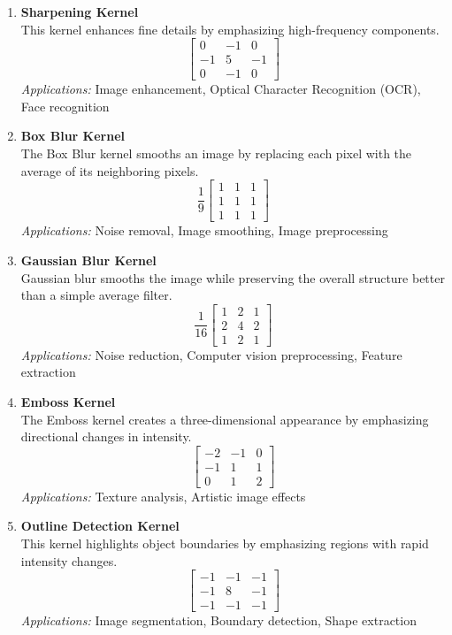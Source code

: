 \documentclass[11pt]{article}
\begin{document}
\begin{enumerate}
\item \textbf{Sharpening Kernel} \\
This kernel enhances fine details by emphasizing high-frequency components.
\[
\begin{bmatrix}
0 & -1 & 0 \\
-1 & 5 & -1 \\
0 & -1 & 0
\end{bmatrix}
\]
\textit{Applications:} Image enhancement, Optical Character Recognition (OCR), Face recognition

\item \textbf{Box Blur Kernel} \\
The Box Blur kernel smooths an image by replacing each pixel with the average of its neighboring pixels.
\[
\frac{1}{9}
\begin{bmatrix}
1 & 1 & 1 \\
1 & 1 & 1 \\
1 & 1 & 1
\end{bmatrix}
\]
\textit{Applications:} Noise removal, Image smoothing, Image preprocessing

\item \textbf{Gaussian Blur Kernel} \\
Gaussian blur smooths the image while preserving the overall structure better than a simple average filter.
\[
\frac{1}{16}
\begin{bmatrix}
1 & 2 & 1 \\
2 & 4 & 2 \\
1 & 2 & 1
\end{bmatrix}
\]
\textit{Applications:} Noise reduction, Computer vision preprocessing, Feature extraction

\item \textbf{Emboss Kernel} \\
The Emboss kernel creates a three-dimensional appearance by emphasizing directional changes in intensity.
\[
\begin{bmatrix}
-2 & -1 & 0 \\
-1 & 1 & 1 \\
0 & 1 & 2
\end{bmatrix}
\]
\textit{Applications:} Texture analysis, Artistic image effects

\item \textbf{Outline Detection Kernel} \\
This kernel highlights object boundaries by emphasizing regions with rapid intensity changes.
\[
\begin{bmatrix}
-1 & -1 & -1 \\
-1 & 8 & -1 \\
-1 & -1 & -1
\end{bmatrix}
\]
\textit{Applications:} Image segmentation, Boundary detection, Shape extraction


\end{enumerate}
\end{document}
